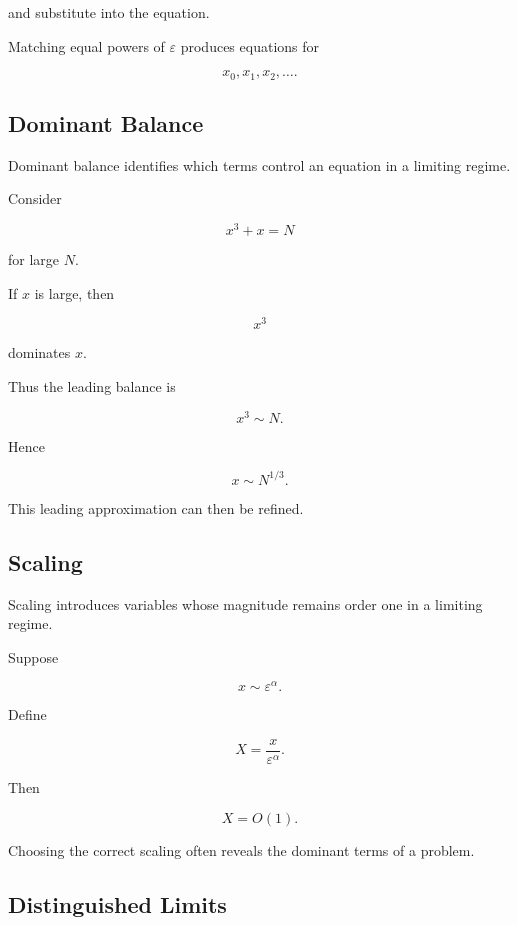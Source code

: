 and substitute into the equation.

Matching equal powers of \(\varepsilon\) produces equations for

\[
x_0,x_1,x_2,\ldots.
\]

\subsection{Dominant Balance}
\label{subsec:dominant-balance}

Dominant balance identifies which terms control an equation in a limiting
regime.

Consider

\[
x^3+x=N
\]

for large \(N\).

If \(x\) is large, then

\[
x^3
\]

dominates \(x\).

Thus the leading balance is

\[
x^3\sim N.
\]

Hence

\[
\boxed{
x\sim N^{1/3}.
}
\]

This leading approximation can then be refined.

\subsection{Scaling}
\label{subsec:asymptotic-scaling}

Scaling introduces variables whose magnitude remains order one in a
limiting regime.

Suppose

\[
x\sim\varepsilon^\alpha.
\]

Define

\[
\boxed{
X=\frac{x}{\varepsilon^\alpha}.
}
\]

Then

\[
X=O(1).
\]

Choosing the correct scaling often reveals the dominant terms of a
problem.

\subsection{Distinguished Limits}
\label{subsec:distinguished-limits}

